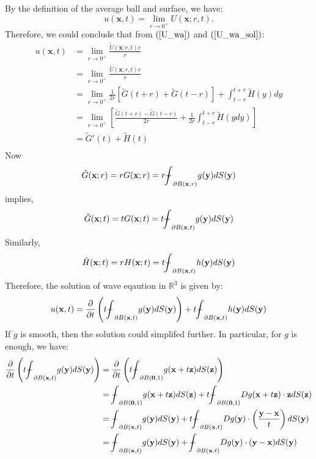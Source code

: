 \documentclass[10pt]{article}
\def\rr{{\mathbb R}}
\def\vc{{\mathbf x}}
\def\vcc{{\mathbf y}}
\def\vccc{{\mathbf z}}
\newcommand\tbbint{{-\mkern -16mu\int}}
\newcommand\dbbint{{-\mkern -19mu\int}}
\newcommand\bbint{
{\mathchoice{\dbbint}{\tbbint}{\tbbint}{\tbbint}}
}
\begin{document}
By the definition of the average ball and surface, we have:
\begin{equation*}
    u(\vc,t) = \lim_{r \to 0^+} U(\vc; r,t).
\end{equation*}
Therefore, we could conclude that from $(\ref{U_wa})$ and $(\ref{U_wa_sol})$:
\begin{align*}
    u(\vc,t) &= \lim_{r \to 0^+} \frac{\tilde{U}(\vc;r,t) r}{r}\\
             &= \lim_{r \to 0^+} \frac{\tilde{U}(\vc;r,t) r}{r}\\
             &= \lim_{r \to 0^+} \frac{1}{2r} \left[\tilde{G}(t+r) + \tilde{G}(t-r) \right]+ \int_{t-r}^{t+r} \tilde{H}(y) dy\\
             &= \lim_{r \to 0^+} \left[\frac{\tilde{G}(t+r)-\tilde{G}(t-r)}{2r}+\frac{1}{2r}\int_{t-r}^{t+r}\tilde{H}(y dy)\right]\\
             &= \tilde{G}'(t) + \tilde{H}(t)\\
\end{align*}
Now
\begin{equation*}
\tilde{G}(\vc; r) = r G(\vc; r) = r \bbint_{\partial B(\vc,r)} g(\vcc) dS(\vcc)
\end{equation*}
implies,
\begin{equation*}
\tilde{G}(\vc; t) = t G(\vc; t) = t \bbint_{\partial B(\vc,t)} g(\vcc) dS(\vcc)
\end{equation*}
Similarly,
\begin{equation*}
\tilde{H}(\vc; t) = r H(\vc; t) = t \bbint_{\partial B(\vc,t)} h(\vcc) dS(\vcc)
\end{equation*}
Therefore, the solution of wave eqaution in $\rr^3$ is given by:
\begin{equation}
    \label{wave_sol}
    u(\vc,t) =\frac{\partial}{\partial t} \left(t \bbint_{\partial B(\vc,t)} g(\mathbf{y}) dS(\mathbf{y})\right) + t \bbint_{\partial B(\vc,t)} h(\mathbf{y}) dS(\mathbf{y})
\end{equation}
If $g$ is smooth, then the solution could simplifed further. In particular, for $g$ is enough, we have:
\begin{align*}
    \frac{\partial}{\partial t}\left(t \bbint_{\partial B(\vc,t)}g(\mathbf{y})dS(\mathbf{y})\right) &= \frac{\partial}{\partial t}\left(t \bbint_{\partial B(\mathbf{0}, 1)}g(\vc+t\vccc)dS(\vccc)\right)\\
    &= \bbint_{\partial B(\mathbf{0},1)} g(\vc+t\vccc)dS(\vccc) + t\bbint_{\partial B(\mathbf{0},1)} Dg(\vc+t\vccc)\cdot \vccc dS(\vccc)\\
    & =\bbint_{\partial B(\vc,t)} g(\vcc)dS(\vcc) + t \bbint_{\partial B(\vc,t)} D g(\vcc) \cdot \left(\frac{\vcc-\vc}{t}\right) dS(\vcc)\\
    & = \bbint_{\partial B(\vc,t)} g(\vcc)dS(\vcc) +  \bbint_{\partial B(\vc,t)} D g(\vcc) \cdot (\vcc-\vc) dS(\vcc)
\end{align*}
\end{document}
